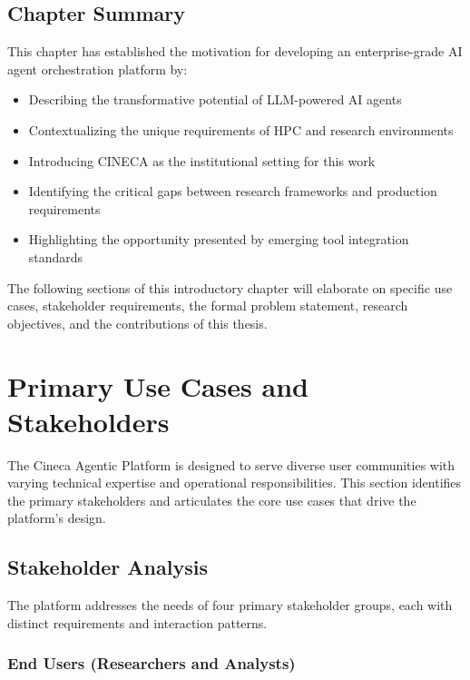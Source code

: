 \documentclass[a4paper,twoside]{sapthesis}
\begin{document}
\subsection{Chapter Summary}

This chapter has established the motivation for developing an enterprise-grade AI agent orchestration platform by:

\begin{itemize}
    \item Describing the transformative potential of LLM-powered AI agents
    \item Contextualizing the unique requirements of HPC and research environments
    \item Introducing CINECA as the institutional setting for this work
    \item Identifying the critical gaps between research frameworks and production requirements
    \item Highlighting the opportunity presented by emerging tool integration standards
\end{itemize}

The following sections of this introductory chapter will elaborate on specific use cases, stakeholder requirements, the formal problem statement, research objectives, and the contributions of this thesis.

\section{Primary Use Cases and Stakeholders}
\label{sec:use-cases-stakeholders}

The Cineca Agentic Platform is designed to serve diverse user communities with varying technical expertise and operational responsibilities. This section identifies the primary stakeholders and articulates the core use cases that drive the platform's design.

\subsection{Stakeholder Analysis}

The platform addresses the needs of four primary stakeholder groups, each with distinct requirements and interaction patterns.

\subsubsection{End Users (Researchers and Analysts)}
\end{document}
